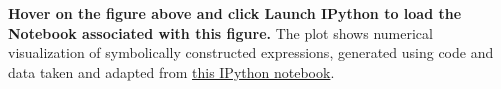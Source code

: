 \textbf{\label{fig:2}} \textbf{Hover on the figure above and click Launch IPython to load the Notebook associated with this figure.} The plot shows numerical visualization of symbolically constructed expressions, generated using code and data taken and adapted from \href{http://nbviewer.ipython.org/static/img/example-nb/sympy.png}{this IPython notebook}.